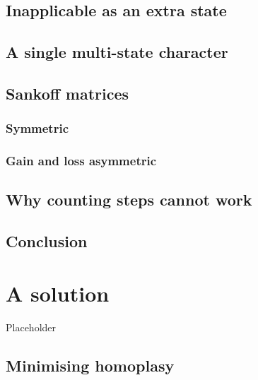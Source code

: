 \documentclass[]{book}
\theoremstyle{definition}
\theoremstyle{definition}
\theoremstyle{definition}
\theoremstyle{remark}
\begin{document}
\hypertarget{inapplicable-as-an-extra-state}{%
\section{Inapplicable as an extra
state}\label{inapplicable-as-an-extra-state}}

\hypertarget{a-single-multi-state-character}{%
\section{A single multi-state
character}\label{a-single-multi-state-character}}

\hypertarget{sankoff-matrices}{%
\section{Sankoff matrices}\label{sankoff-matrices}}

\hypertarget{symmetric}{%
\subsection{Symmetric}\label{symmetric}}

\hypertarget{gain-and-loss-asymmetric}{%
\subsection{Gain and loss asymmetric}\label{gain-and-loss-asymmetric}}

\hypertarget{why-counting-steps-cannot-work}{%
\section{Why counting steps cannot
work}\label{why-counting-steps-cannot-work}}

\hypertarget{conclusion}{%
\section{Conclusion}\label{conclusion}}

\hypertarget{solution}{%
\chapter{A solution}\label{solution}}

Placeholder

\hypertarget{minimising-homoplasy}{%
\section{Minimising homoplasy}\label{minimising-homoplasy}}
\end{document}

